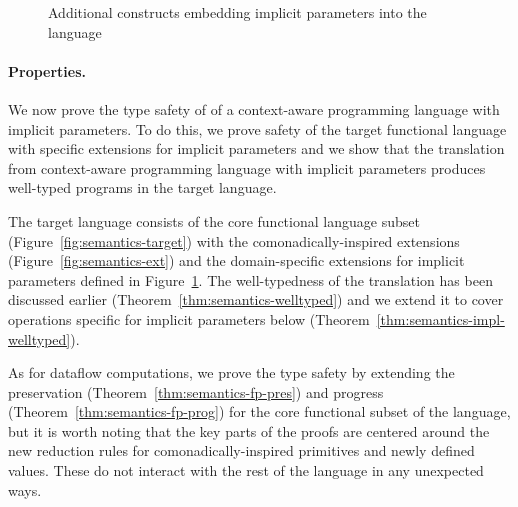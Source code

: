 \begin{figure}[h!]
\vspace{-0.5em}
\caption{Additional constructs embedding implicit parameters into the language}
\label{fig:semantics-ext-impl}
\end{figure}


\paragraph{Properties.}
We now prove the type safety of of a context-aware programming language with implicit parameters.
To do this, we prove safety of the target functional language with specific extensions for implicit
parameters and we show that the translation from context-aware programming language with implicit
parameters produces well-typed programs in the target language.

The target language consists of the core functional language subset (Figure~\ref{fig:semantics-target})
with the comonadically-inspired extensions (Figure~\ref{fig:semantics-ext}) and the domain-specific
extensions for implicit parameters defined in Figure~\ref{fig:semantics-ext-impl}. The well-typedness
of the translation has been discussed earlier (Theorem~\ref{thm:semantics-welltyped}) and we extend
it to cover operations specific for implicit parameters below (Theorem~\ref{thm:semantics-impl-welltyped}).

As for dataflow computations, we prove the type safety by extending the preservation
(Theorem~\ref{thm:semantics-fp-pres}) and progress (Theorem~\ref{thm:semantics-fp-prog})
for the core functional subset of the language, but it is worth noting that the key parts of
the proofs are centered around the new reduction rules for comonadically-inspired primitives
and newly defined  values. These do not interact with the rest of the language in
any unexpected ways.

